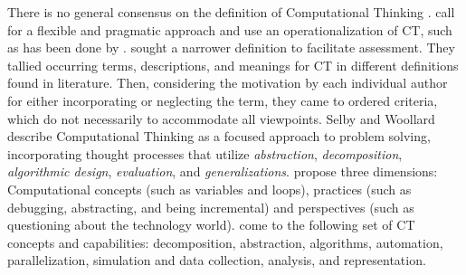 There is no general consensus on the definition of Computational Thinking \cite{Yadav2015}.  call for a flexible and pragmatic approach and use an operationalization of CT, such as has been done by .  sought a narrower definition to facilitate assessment. They tallied occurring terms, descriptions, and meanings for CT in different definitions found in literature. Then, considering the motivation by each individual author for either incorporating or neglecting the term, they came to ordered criteria, which do not necessarily to accommodate all viewpoints. Selby and Woollard \cite{selby2013computational} describe Computational Thinking as a focused approach to problem solving, incorporating thought processes that utilize \emph{abstraction}, \emph{decomposition}, \emph{algorithmic design}, \emph{evaluation}, and \emph{generalizations}.  propose three dimensions: Computational concepts (such as variables and loops), practices (such as debugging, abstracting, and being incremental) and perspectives (such as  questioning about the technology world).  come to the following set of CT concepts and capabilities: decomposition, abstraction, algorithms, automation, parallelization, simulation and data collection, analysis, and representation.
%


